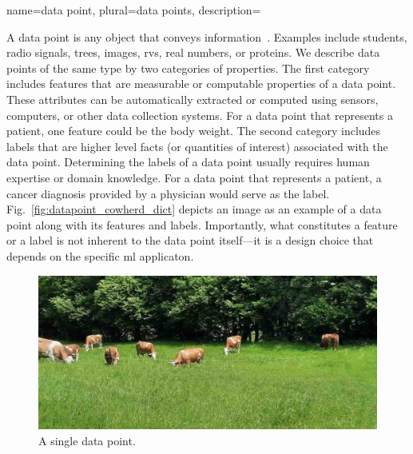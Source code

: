 {name={data point}, plural={data points},
	description={A \gls{data} point is any object that conveys information~\cite{coverthomas}. 
		Examples include students, radio signals, trees, images, \glspl{rv}, real numbers, 
 		or proteins. We describe \gls{data} points of the same type by two categories 
		of properties. The first category includes \glspl{feature} that are \gls{measurable} or computable properties of a 
		\gls{data} point. These attributes can be automatically extracted or computed using sensors, computers, or other
		\gls{data} collection systems. For a \gls{data} point that represents a patient, one \gls{feature} could be the body weight.
    		The second category includes \glspl{label} that are higher level facts (or quantities of interest) 
		associated with the \gls{data} point. Determining the \glspl{label} of a \gls{data} point 
		usually requires human expertise or domain knowledge. For a \gls{data} point that represents a patient, 
		a cancer diagnosis provided by a physician would serve as the \gls{label}. 
		Fig.\ \ref{fig:datapoint_cowherd_dict} depicts an image as an example of a \gls{data} 
		point along with its \glspl{feature} and \glspl{label}. Importantly, what constitutes 
		a \gls{feature} or a \gls{label} is not inherent to the \gls{data} point itself—it is a design 
		choice that depends on the specific \gls{ml} applicaton.
		\begin{figure}[H]
    		\centering
    			\begin{minipage}[t]{0.95\textwidth}
        			\centering
        			\includegraphics[width=\textwidth]{assets/CowsAustria.jpg}
        			\caption*{A single \gls{data} point.}
        			\vspace{5mm}
    			\end{minipage}
    			\begin{minipage}[t]{0.95\textwidth}

\end{minipage}
\end{figure}}}
